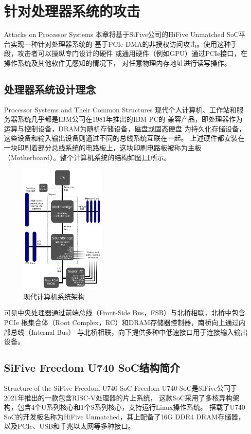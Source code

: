 
\chapter{针对处理器系统的攻击}{Attacks on Processor Systems}
本章将基于SiFive公司的HiFive Unmatched SoC平台实现一种针对处理器系统的
基于PCIe DMA的非授权访问攻击。使用这种手段，攻击者可以操纵专门设计的硬件
或通用硬件（例如GPU）通过PCIe接口，在操作系统及其他软件无感知的情况下，
对任意物理内存地址进行读写操作。

\section{处理器系统设计理念}{Processor Systems and Their Common Structures}
现代个人计算机、工作站和服务器系统几乎都是IBM公司在1981年推出的IBM PC的
兼容产品，即处理器作为运算与控制设备，DRAM为随机存储设备，磁盘或固态硬盘
为持久化存储设备，这些设备和输入输出设备则通过不同的总线系统互联在一起。
上述硬件都安装在一块印刷着部分总线系统的电路板上，这块印刷电路板被称为主板
（Motherboard）。整个计算机系统的结构如图\ref{fig:mb-diag}所示。

\begin{figure}[ht]
	\centering
	\includegraphics[width=0.38\textwidth]{figs/motherboard_diagram.pdf}
	\caption{现代计算机系统架构\cite{wiki:mb-fig}}
	\label{fig:mb-diag}
\end{figure}

可见中央处理器通过前端总线（Front-Side Bus，FSB）与北桥相联，北桥中包含PCIe
根集合体（Root Complex，RC）和DRAM存储器控制器，南桥向上通过内部总线（Internal Bus）
与北桥相联，向下提供多种中低速接口用于连接输入输出设备。

\section{SiFive Freedom U740 SoC结构简介}{Structure of the SiFive Freedom U740 SoC}
Freedom U740 SoC是SiFive公司于2021年推出的一款包含RISC-V处理器的片上系统，
这款SoC采用了多核异构架构，包含4个U系列核心和1个S系列核心，支持运行Linux操作系统。
搭载了U740 SoC的开发板名称为HiFive Unmatched，其上配备了16G DDR4 DRAM存储器，
以及PCIe、USB和千兆以太网等多种接口。

